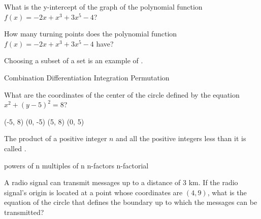 \begin{questions}
\question What is the y-intercept of the graph of the polynomial function $f(x) = -2x + x^3 + 3x^5 -4$?

\begin{multicols}{4}
\begin{choices}  
\end{choices}
\end{multicols} 

\question How many turning points does the polynomial function $f(x) = -2x + x^3 + 3x^5 - 4$ have?

\begin{multicols}{4}
\begin{choices}  
\end{choices}
\end{multicols} 

\question Choosing  a  subset  of  a  set  is an  example  of \blank.
\begin{multicols}{4}
\begin{choices}  
\CorrectChoice Combination 
\choice Differentiation 
\choice Integration 
\choice Permutation 
\end{choices}
\end{multicols}

\question What are the coordinates of the center of the circle defined by the equation $x^2 + (y-5)^2 = 8$?

\begin{multicols}{4}
\begin{choices}  
\choice (-5, 8)
\choice (0, -5)
\choice (5, 8)
\CorrectChoice (0, 5)
\end{choices}
\end{multicols}

\question The  product  of  a  positive  integer  $n$  and  all  the  positive  integers  less than  it  is called \blank.      
\begin{multicols}{4}
\begin{choices}  
\choice powers of  n
\choice multiples  of  n
\choice n-factors
\CorrectChoice n-factorial 
\end{choices}
\end{multicols} 

\question A radio signal can transmit messages up to a distance of 3 km. If the radio
signal’s origin is located at a point whose coordinates are $(4, 9)$, what is
the equation of the circle that defines the boundary up to which the messages can be transmitted?


\end{questions}

